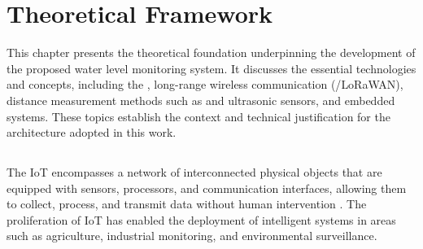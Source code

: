\chapter{Theoretical Framework} \label{cap:theoretical}





This chapter presents the theoretical foundation underpinning the development of the proposed water level monitoring system. It discusses the essential technologies and concepts, including the , long-range wireless communication (/\gls{LoRaWAN}), distance measurement methods such as  and ultrasonic sensors, and embedded systems. These topics establish the context and technical justification for the architecture adopted in this work.

\section{}

The \gls{IoT} encompasses a network of interconnected physical objects that are equipped with sensors, processors, and communication interfaces, allowing them to collect, process, and transmit data without human intervention . The proliferation of \gls{IoT} has enabled the deployment of intelligent systems in areas such as agriculture, industrial monitoring, and environmental surveillance. \cite{Madakam:2015,javaid_2021_sensors}

